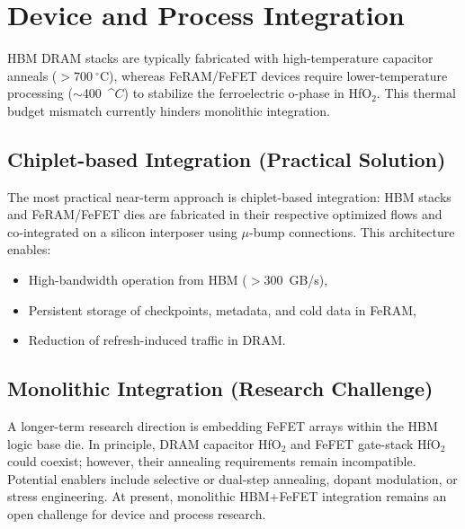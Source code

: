 \section{Device and Process Integration}
HBM DRAM stacks are typically fabricated with high-temperature capacitor anneals ($>700~^\circ$C),
whereas FeRAM/FeFET devices require lower-temperature processing ($\sim$400~^\circ$C$) to stabilize the ferroelectric o-phase in HfO$_2$.
This thermal budget mismatch currently hinders monolithic integration.

\subsection{Chiplet-based Integration (Practical Solution)}
The most practical near-term approach is chiplet-based integration:
HBM stacks and FeRAM/FeFET dies are fabricated in their respective optimized flows and co-integrated on a silicon interposer using $\mu$-bump connections.
This architecture enables:
\begin{itemize}
  \item High-bandwidth operation from HBM ($>$300~GB/s),
  \item Persistent storage of checkpoints, metadata, and cold data in FeRAM,
  \item Reduction of refresh-induced traffic in DRAM.
\end{itemize}

\subsection{Monolithic Integration (Research Challenge)}
A longer-term research direction is embedding FeFET arrays within the HBM logic base die.
In principle, DRAM capacitor HfO$_2$ and FeFET gate-stack HfO$_2$ could coexist; however, their annealing requirements remain incompatible.
Potential enablers include selective or dual-step annealing, dopant modulation, or stress engineering.
At present, monolithic HBM+FeFET integration remains an open challenge for device and process research.


